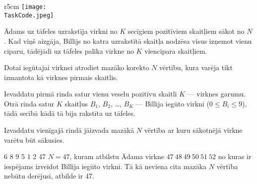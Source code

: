 \documentclass{boi2014-lv}
\renewcommand{\TaskCode}{sequence}
\begin{document}
    \begin{wrapfigure}[5]{r}{5cm}
        \vspace{-24pt}
		\texttt{[image: \\TaskCode.jpeg]}
	\end{wrapfigure}

		Ādams uz tāfeles uzrakstīja virkni no $K$ secīgiem pozitīviem skaitļiem sākot no $N$. Kad viņš aizgāja, Billijs no katra uzrakstītā skaitļa nodzēsa visus izņemot vienu ciparu, tādējādi uz tāfeles palika virkne no $K$ viencipara skaitļiem. 

    \Task

		Dotai iegūtajai virknei atrodiet mazāko korekto $N$ vērtību, kura varēja tikt izmantota kā virknes pirmais skaitlis.

    \Input

		Ievaddatu pirmā rinda satur vienu veselu pozitīvu skaitli $K$ --- virknes garumu. Otrā rinda satur $K$ skaitļus $B_1$, $B_2$, \dots, $B_K$ --- Billija iegūto virkni ($0 \le B_i \le 9$),  tādā secībā kādā tā bija rakstīta uz tāfeles.
		

    \Output

		Izvaddatu vienīgajā rindā jāizvada mazākā $N$ vērtība ar kuru sākotnējā virkne varētu būt sākusies.

    \Example

    \example
    {
        6 8 9 5 1 2
    }
    {
        47
    }
    {
				$N = 47$, kuram atbilstu Ādama virkne $47\ 48\ 49\ 50\ 51\ 52$ no kuras ir iespējams izveidot Billija iegūto virkni. Tā kā neviena cita mazāka $N$ vērtība nebūtu derējusi, atbilde ir 47.
    }
\end{document}
